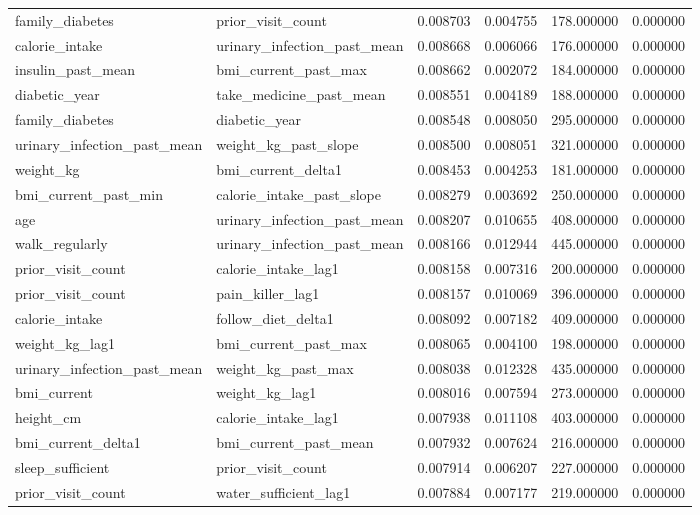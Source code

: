 \begin{longtable}{llrrrr}
family\_diabetes & prior\_visit\_count & 0.008703 & 0.004755 & 178.000000 & 0.000000 \\
calorie\_intake & urinary\_infection\_past\_mean & 0.008668 & 0.006066 & 176.000000 & 0.000000 \\
insulin\_past\_mean & bmi\_current\_past\_max & 0.008662 & 0.002072 & 184.000000 & 0.000000 \\
diabetic\_year & take\_medicine\_past\_mean & 0.008551 & 0.004189 & 188.000000 & 0.000000 \\
family\_diabetes & diabetic\_year & 0.008548 & 0.008050 & 295.000000 & 0.000000 \\
urinary\_infection\_past\_mean & weight\_kg\_past\_slope & 0.008500 & 0.008051 & 321.000000 & 0.000000 \\
weight\_kg & bmi\_current\_delta1 & 0.008453 & 0.004253 & 181.000000 & 0.000000 \\
bmi\_current\_past\_min & calorie\_intake\_past\_slope & 0.008279 & 0.003692 & 250.000000 & 0.000000 \\
age & urinary\_infection\_past\_mean & 0.008207 & 0.010655 & 408.000000 & 0.000000 \\
walk\_regularly & urinary\_infection\_past\_mean & 0.008166 & 0.012944 & 445.000000 & 0.000000 \\
prior\_visit\_count & calorie\_intake\_lag1 & 0.008158 & 0.007316 & 200.000000 & 0.000000 \\
prior\_visit\_count & pain\_killer\_lag1 & 0.008157 & 0.010069 & 396.000000 & 0.000000 \\
calorie\_intake & follow\_diet\_delta1 & 0.008092 & 0.007182 & 409.000000 & 0.000000 \\
weight\_kg\_lag1 & bmi\_current\_past\_max & 0.008065 & 0.004100 & 198.000000 & 0.000000 \\
urinary\_infection\_past\_mean & weight\_kg\_past\_max & 0.008038 & 0.012328 & 435.000000 & 0.000000 \\
bmi\_current & weight\_kg\_lag1 & 0.008016 & 0.007594 & 273.000000 & 0.000000 \\
height\_cm & calorie\_intake\_lag1 & 0.007938 & 0.011108 & 403.000000 & 0.000000 \\
bmi\_current\_delta1 & bmi\_current\_past\_mean & 0.007932 & 0.007624 & 216.000000 & 0.000000 \\
sleep\_sufficient & prior\_visit\_count & 0.007914 & 0.006207 & 227.000000 & 0.000000 \\
prior\_visit\_count & water\_sufficient\_lag1 & 0.007884 & 0.007177 & 219.000000 & 0.000000 \\

\end{longtable}
